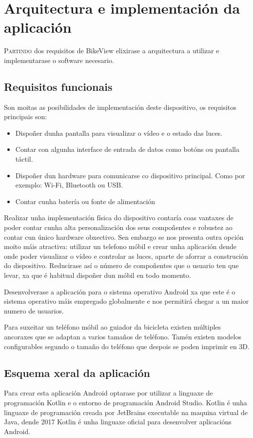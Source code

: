 \chapter{Arquitectura e implementación da aplicación}
\label{chap:implementacion_aplicacion}
\lettrine{P}{artindo} dos requisitos de BikeView elixirase a arquitectura a utilizar e implementarase o software necesario.

\section{Requisitos funcionais}

Son moitas as posibilidades de implementación deste dispositivo, os requisitos principais son:
\begin{itemize}
    \item Dispoñer dunha pantalla para visualizar o vídeo e o estado das luces.
    \item Contar con algunha interface de entrada de datos como botóns ou pantalla táctil.
    \item Dispoñer dun hardware para comunicarse co dispositivo principal. Como por exemplo: Wi-Fi, Bluetooth ou USB.
    \item Contar cunha batería ou fonte de alimentación
\end{itemize}

Realizar unha implementación física do dispositivo contaría coas vantaxes de poder contar cunha alta personalización dos seus compoñentes e robustez ao contar cun único hardware obxectivo. Sen embargo se nos presenta outra opción moito máis atractiva: utilizar un telefono móbil e crear unha aplicación dende onde poder visualizar o vídeo e controlar as luces, aparte de aforrar a construción do dispositivo. Reducirase así o número de compoñentes que o usuario ten que levar, xa que é habitual dispoñer dun móbil en todo momento.

Desenvolverase a aplicación para o sistema operativo Android xa que este é o sistema operativo máis empregado globalmente e nos permitirá chegar a un maior numero de usuarios.

Para suxeitar un teléfono móbil ao guiador da bicicleta existen múltiples ancoraxes que se adaptan a varios tamaños de teléfono. Tamén existen modelos configurables segundo o tamaño do teléfono que despois se poden imprimir en 3D.

\section{Esquema xeral da aplicación}
Para crear esta aplicación Android optarase por utilizar a linguaxe de programación Kotlin e o entorno de programación Android Studio. Kotlin é unha linguaxe de programación creada por JetBrains executable na maquina virtual de Java, dende 2017 Kotlin é unha linguaxe oficial para desenvolver aplicacións Android.

